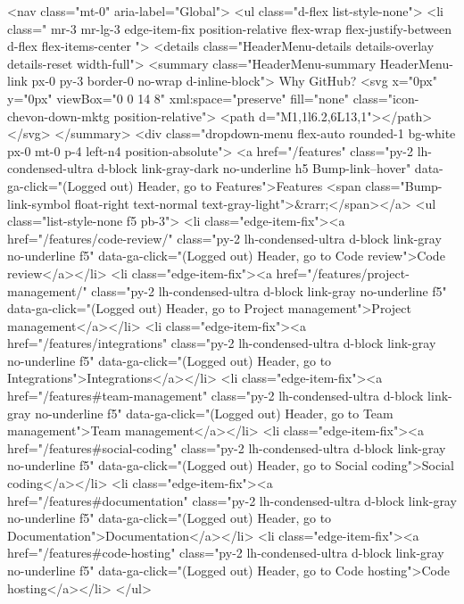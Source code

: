         <nav class="mt-0" aria-label="Global">
          <ul class="d-flex list-style-none">
              <li class=" mr-3 mr-lg-3 edge-item-fix position-relative flex-wrap flex-justify-between d-flex flex-items-center ">
                <details class="HeaderMenu-details details-overlay details-reset width-full">
                  <summary class="HeaderMenu-summary HeaderMenu-link px-0 py-3 border-0 no-wrap  d-inline-block">
                    Why GitHub?
                    <svg x="0px" y="0px" viewBox="0 0 14 8" xml:space="preserve" fill="none" class="icon-chevon-down-mktg position-relative">
                      <path d="M1,1l6.2,6L13,1"></path>
                    </svg>
                  </summary>
                  <div class="dropdown-menu flex-auto rounded-1 bg-white px-0 mt-0  p-4 left-n4 position-absolute">
                    <a href="/features" class="py-2 lh-condensed-ultra d-block link-gray-dark no-underline h5 Bump-link--hover" data-ga-click="(Logged out) Header, go to Features">Features <span class="Bump-link-symbol float-right text-normal text-gray-light">&rarr;</span></a>
                    <ul class="list-style-none f5 pb-3">
                      <li class="edge-item-fix"><a href="/features/code-review/" class="py-2 lh-condensed-ultra d-block link-gray no-underline f5" data-ga-click="(Logged out) Header, go to Code review">Code review</a></li>
                      <li class="edge-item-fix"><a href="/features/project-management/" class="py-2 lh-condensed-ultra d-block link-gray no-underline f5" data-ga-click="(Logged out) Header, go to Project management">Project management</a></li>
                      <li class="edge-item-fix"><a href="/features/integrations" class="py-2 lh-condensed-ultra d-block link-gray no-underline f5" data-ga-click="(Logged out) Header, go to Integrations">Integrations</a></li>
                      <li class="edge-item-fix"><a href="/features#team-management" class="py-2 lh-condensed-ultra d-block link-gray no-underline f5" data-ga-click="(Logged out) Header, go to Team management">Team management</a></li>
                      <li class="edge-item-fix"><a href="/features#social-coding" class="py-2 lh-condensed-ultra d-block link-gray no-underline f5" data-ga-click="(Logged out) Header, go to Social coding">Social coding</a></li>
                      <li class="edge-item-fix"><a href="/features#documentation" class="py-2 lh-condensed-ultra d-block link-gray no-underline f5" data-ga-click="(Logged out) Header, go to Documentation">Documentation</a></li>
                      <li class="edge-item-fix"><a href="/features#code-hosting" class="py-2 lh-condensed-ultra d-block link-gray no-underline f5" data-ga-click="(Logged out) Header, go to Code hosting">Code hosting</a></li>
                    </ul>

